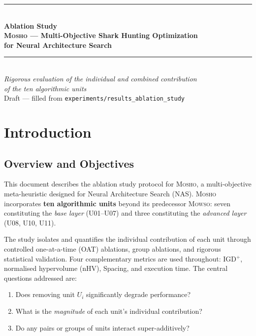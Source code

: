 \documentclass[11pt,a4paper]{article}
\newcommand{\mosho}{\textsc{Mosho}}
\newcommand{\mowso}{\textsc{Mowso}}
\begin{document}
\begin{titlepage}
  \centering
  \vspace*{2cm}
  {\color{headerblue}\rule{\linewidth}{1.5pt}}\\[6pt]
  {\LARGE\bfseries\color{headerblue}
    Ablation Study\\[4pt]
    \mosho{} --- Multi-Objective Shark Hunting Optimization\\[4pt]
    for Neural Architecture Search}\\[6pt]
  {\color{headerblue}\rule{\linewidth}{1.5pt}}\\[1.5cm]
  {\large\itshape Rigorous evaluation of the individual and combined
   contribution\\of the ten algorithmic units}\\[2cm]
 
  {\small\color{gray} Draft --- filled from \texttt{experiments/results\_ablation\_study}}
\end{titlepage}

\tableofcontents
\clearpage

\section{Introduction}
\label{sec:intro}

\subsection{Overview and Objectives}
\label{sec:intro_overview}

This document describes the ablation study protocol for \mosho{}, a
multi-objective meta-heuristic designed for Neural Architecture Search
(NAS). \mosho{} incorporates \textbf{ten algorithmic units} beyond its
predecessor \mowso{}: seven constituting the \emph{base layer} (U01--U07)
and three constituting the \emph{advanced layer} (U08, U10, U11).

The study isolates and quantifies the individual contribution of each unit
through controlled one-at-a-time (OAT) ablations, group ablations, and
rigorous statistical validation.  Four complementary metrics are used
throughout: IGD$^+$, normalised hypervolume (nHV), Spacing, and execution
time.  The central questions addressed are:

\begin{enumerate}[leftmargin=2em, itemsep=3pt]
  \item Does removing unit $U_i$ significantly degrade performance?
  \item What is the \emph{magnitude} of each unit's individual contribution?
  \item Do any pairs or groups of units interact super-additively?
 
\end{enumerate}
\end{document}
